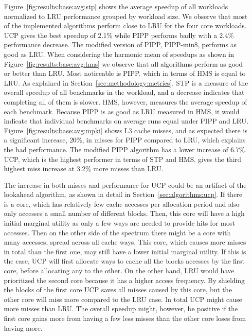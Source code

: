 Figure~\ref{fig:results:base:avg:stp} shows the average speedup of all workloads normalized to LRU performance grouped by workload size.
We observe that most of the implemented algorithms perform close to LRU for the four core workloads.
UCP gives the best speedup of 2.1\% while PIPP performs badly with a 2.4\% performance decrease. 
The modified version of PIPP, PIPP-min8, performs as good as LRU.
When considering the harmonic mean of speedups as shown in Figure~\ref{fig:results:base:avg:hms} we observe that all algorithms perform as good or better than LRU.  
Most noticeable is PIPP, which in terms of HMS is equal to LRU.
As explained in Section~\ref{sec:methodology:metrics}, STP  is a measure of the overall speedup of all benchmarks in the workload, and a decrease indicates that completing all of them is slower.
HMS, however, measures the average speedup of each benchmark.
Because PIPP is as good as LRU measured in HMS, it would indicate that individual benchmarks on average runs equal under PIPP and LRU.
Figure~\ref{fig:results:base:avg:mpki} shows L3 cache misses, and as expected there is a significant increase, 20\%, in misses for PIPP compared to LRU, which explains the bad performance. 
The modified PIPP algorithm has a lower increase of 6.7\%.
UCP, which is the highest performer in terms of STP and HMS, gives the third highest miss increase at 3.2\% more misses than LRU. 

The increase in both misses and performance for UCP could be an artifact of the lookahead algorithm, as shown in detail in Section~\ref{sec:algorithms:ucp}.
If there is a core, which has relatively few cache accesses per allocation period and also only accesses a small number of different blocks.
Then, this core will have a high initial marginal utility as only a few ways are needed to provide hits for most accesses.
Then on the other side of the spectrum there might be a core with many accesses, spread across all cache ways.
This core, which causes more misses in total than the first one, may still have a lower initial marginal utility.
If this is the case, UCP will first allocate ways to cache all the blocks accesses by the first core, before allocating any to the other.
On the other hand, LRU would have prioritized the second core because it has a higher access frequency.
By shielding the blocks of the first core UCP saves all misses caused by this core, but the other core will miss more compared to the LRU case.
In total UCP might cause more misses than LRU.
The overall speedup might, however, be positive if the first core gains more from having a few less misses than the other core loses from having more.



